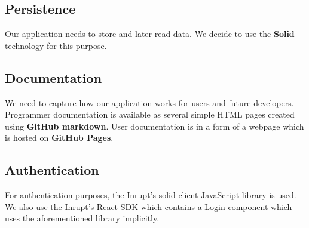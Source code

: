 \subsection*{Persistence}
Our application needs to store and later read data.
We decide to use the \textbf{Solid} technology for this purpose. 

\subsection*{Documentation}
We need to capture how our application works for users and future developers.
Programmer documentation is available as several simple HTML pages created using \textbf{GitHub markdown}.
User documentation is in a form of a webpage which is hosted on \textbf{GitHub Pages}.

\subsection*{Authentication}
For authentication purposes, the Inrupt's solid-client JavaScript library is used.
We also use the Inrupt's React SDK which contains a Login component which uses the aforementioned library implicitly.

